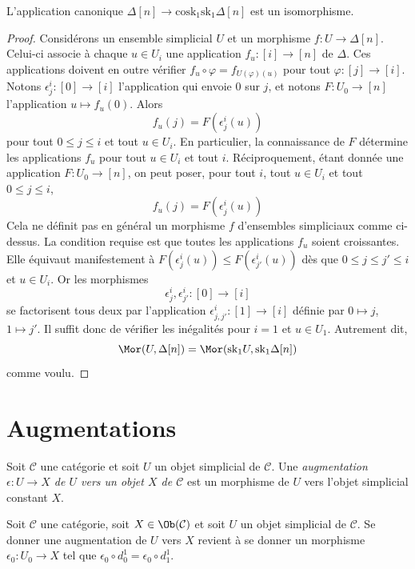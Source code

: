 \begin{lemma}
\label{lemma-simplex-cosk}
L'application canonique
$\Delta[n] \to \text{cosk}_1 \text{sk}_1 \Delta[n]$
est un isomorphisme.
\end{lemma}

\begin{proof}
Considérons un ensemble simplicial $U$ et un morphisme
$f : U \to \Delta[n]$. Celui-ci associe à chaque $u \in U_i$ une
application $f_u : [i] \to [n]$ de $\Delta$. Ces applications doivent en
outre vérifier $f_u \circ \varphi = f_{U(\varphi)(u)}$ pour tout
$\varphi : [j] \to [i]$. Notons $\epsilon^i_j : [0] \to [i]$
l'application qui envoie $0$ sur $j$, et notons $F : U_0 \to [n]$
l'application $u \mapsto f_u(0)$. Alors
$$
f_u(j) = F(\epsilon^i_j(u))
$$
pour tout $0 \leq j \leq i$ et tout $u \in U_i$. En particulier, la
connaissance de $F$ détermine les applications $f_u$ pour tout
$u\in U_i$ et tout $i$. Réciproquement, étant donnée une application
$F : U_0 \to [n]$, on peut poser, pour tout $i$, tout $u \in U_i$ et
tout $0 \leq j \leq i$,
$$
f_u(j) = F(\epsilon^i_j(u))
$$
Cela ne définit pas en général un morphisme $f$ d'ensembles simpliciaux
comme ci-dessus. La condition requise est que toutes les applications
$f_u$ soient croissantes. Elle équivaut manifestement à
$F(\epsilon^i_j(u)) \leq F(\epsilon^i_{j'}(u))$ dès que
$0 \leq j \leq j' \leq i$ et $u \in U_i$. Or les morphismes
$$
\epsilon^i_j, \epsilon^i_{j'} : [0] \to [i]
$$
se factorisent tous deux par l'application
$\epsilon^i_{j, j'} : [1] \to [i]$ définie par
$0 \mapsto j$, $1 \mapsto j'$. Il suffit donc de vérifier les inégalités
pour $i = 1$ et $u \in U_1$. Autrement dit,
$$
\Mor(U, \Delta[n])
=
\Mor(\text{sk}_1 U, \text{sk}_1 \Delta[n])
$$
comme voulu.
\end{proof}



\section{Augmentations}
\label{section-augmentation}

\begin{definition}
\label{definition-augmentation}
Soit $\mathcal{C}$ une catégorie et soit $U$ un objet simplicial de
$\mathcal{C}$. Une {\it augmentation $\epsilon : U \to X$ de $U$ vers
un objet $X$ de $\mathcal{C}$} est un morphisme de $U$ vers l'objet
simplicial constant $X$.
\end{definition}

\begin{lemma}
\label{lemma-augmentation-howto}
Soit $\mathcal{C}$ une catégorie, soit $X \in \Ob(\mathcal{C})$ et soit
$U$ un objet simplicial de $\mathcal{C}$. Se donner une augmentation de
$U$ vers $X$ revient à se donner un morphisme $\epsilon_0 : U_0 \to X$
tel que $\epsilon_0 \circ d^1_0 = \epsilon_0 \circ d^1_1$.
\end{lemma}

